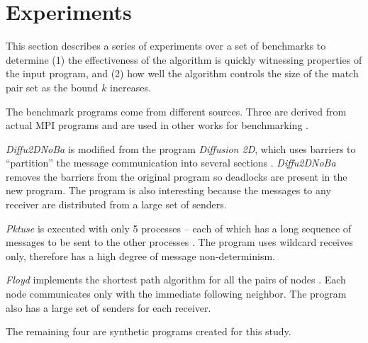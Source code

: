 \section{Experiments}
This section describes a series of experiments over a set of benchmarks to determine (1) the effectiveness of the algorithm is quickly witnessing properties of the input program, and (2) how well the algorithm controls the size of the match pair set as the bound $k$ increases.

The benchmark programs come from different sources. Three are derived from actual MPI programs and are used in other works for benchmarking \cite{benchmark:fevs,mpptest_benchmark,DBLP:conf/ppopp/XueLWGCZZV09}.

\begin{compactitem}
\item \textit{Diffu2DNoBa} is modified from the program \textit{Diffusion 2D}, which uses barriers to “partition” the message communication into several sections \cite{benchmark:fevs}. \textit{Diffu2DNoBa} removes the barriers from the original program so deadlocks are present in the new program. The program is also interesting because the messages to any receiver are distributed from a large set of senders.

\item \textit{Pktuse} is executed with only 5 processes -- each of which has a long sequence of messages to be sent to the other processes \cite{mpptest_benchmark}. The program uses wildcard receives only, therefore has a high degree of message non-determinism. 

\item \textit{Floyd} implements the shortest path algorithm for all the pairs of nodes \cite{DBLP:conf/ppopp/XueLWGCZZV09}. Each node communicates only with the immediate following neighbor. The program also has a large set of senders for each receiver. 
\end{compactitem}

The remaining four are synthetic programs created for this study.

